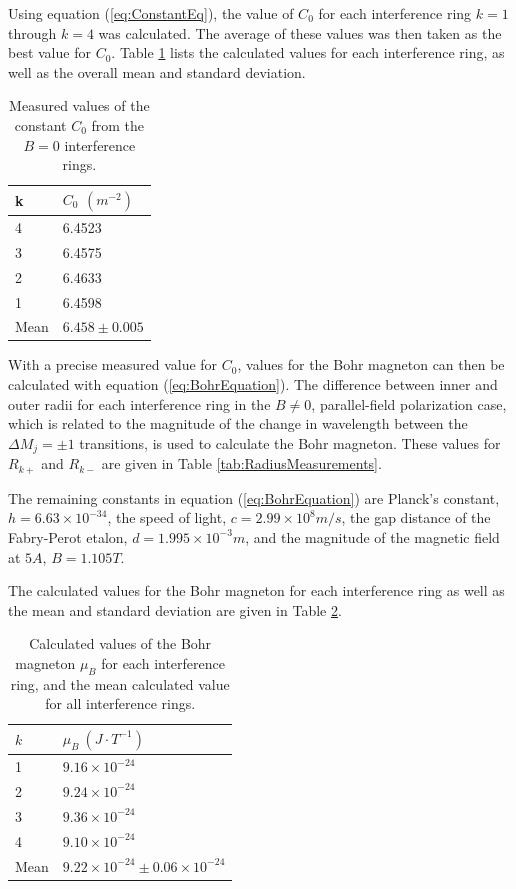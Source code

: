 \documentclass[twocolumn]{article}
\begin{document}
		Using equation (\ref{eq:ConstantEq}), the value of $C_0$ for each interference ring $k=1$ through $k=4$ was calculated.
		The average of these values was then taken as the best value for $C_0$.
		Table \ref{tab:C0} lists the calculated values for each interference ring, as well as the overall mean and standard deviation.
		
		\begin{table}[]
			\centering
			\begin{tabular}{l|l}
				k & $C_0$ $(m^{-2})$ \\ \hline
				4 & 6.4523 \\
				3 & 6.4575 \\
				2 & 6.4633 \\
				1 & 6.4598 \\ \hline
				Mean & $6.458\pm0.005$
			\end{tabular}
			\caption{Measured values of the constant $C_0$ from the $B=0$ interference rings.}
			\label{tab:C0}
		\end{table}
		
		With a precise measured value for $C_0$, values for the Bohr magneton can then be calculated with equation (\ref{eq:BohrEquation}).
		The difference between inner and outer radii for each interference ring in the $B\neq 0$, parallel-field polarization case, which is related to the magnitude of the change in wavelength between the $\Delta M_j = \pm1$ transitions, is used to calculate the Bohr magneton.
		These values for $R_{k+}$ and $R_{k-}$ are given in Table \ref{tab:RadiusMeasurements}.
		
		The remaining constants in equation (\ref{eq:BohrEquation}) are Planck's constant, $h = 6.63\times10^{-34}$, the speed of light, $c = 2.99\times10^8 m/s$, the gap distance of the Fabry-Perot etalon, $d = 1.995\times10^{-3} m$, and the magnitude of the magnetic field at $5 A$, $B = 1.105 T$.
		
		The calculated values for the Bohr magneton for each interference ring as well as the mean and standard deviation are given in Table \ref{tab:BohrCalcs}.
		
		\begin{table}[]
			\centering
			\begin{tabular}{l|l}
				$k$  & $\mu_B \ (J\cdot T^{-1})$ \\ \hline
				1    & $9.16\times10^{-24}$   \\
				2    & $9.24\times10^{-24}$   \\
				3    & $9.36\times10^{-24}$   \\
				4    & $9.10\times10^{-24}$   \\ \hline
				Mean & $9.22\times10^{-24}\pm0.06\times10^{-24}$  
			\end{tabular}
			\caption{Calculated values of the Bohr magneton $\mu_B$ for each interference ring, and the mean calculated value for all interference rings.}
			\label{tab:BohrCalcs}
		\end{table}
		
\end{document}
